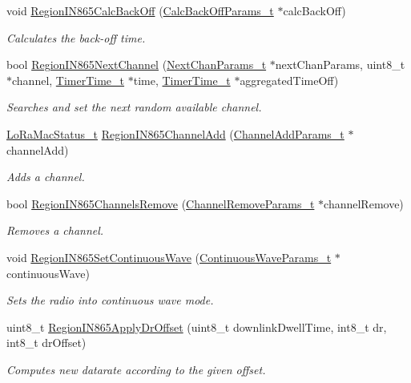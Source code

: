 \begin{DoxyCompactItemize}
void \hyperlink{group__REGIONIN865_ga3227ad7396d15635880bcfe112f57295}{Region\+I\+N865\+Calc\+Back\+Off} (\hyperlink{group__REGION_ga7c5c9a8da174e6679eded8257dc92fd9}{Calc\+Back\+Off\+Params\+\_\+t} $\ast$calc\+Back\+Off)
\begin{DoxyCompactList}\small\item\em Calculates the back-\/off time. \end{DoxyCompactList}\item 
bool \hyperlink{group__REGIONIN865_ga70136739289eea7ad9707011adbad481}{Region\+I\+N865\+Next\+Channel} (\hyperlink{group__REGION_ga115f5e83afae352c0a3dcdc193374040}{Next\+Chan\+Params\+\_\+t} $\ast$next\+Chan\+Params, uint8\+\_\+t $\ast$channel, \hyperlink{utilities_8h_a4215ca43d3e953099ea758ce428599d0}{Timer\+Time\+\_\+t} $\ast$time, \hyperlink{utilities_8h_a4215ca43d3e953099ea758ce428599d0}{Timer\+Time\+\_\+t} $\ast$aggregated\+Time\+Off)
\begin{DoxyCompactList}\small\item\em Searches and set the next random available channel. \end{DoxyCompactList}\item 
\hyperlink{group__LORAMAC_ga30bd25657e10480f8605ee951b0ecfbd}{Lo\+Ra\+Mac\+Status\+\_\+t} \hyperlink{group__REGIONIN865_ga409780ea153146450bde780493f00b1b}{Region\+I\+N865\+Channel\+Add} (\hyperlink{group__REGION_gab1c5f3aa06614283202906cef4417860}{Channel\+Add\+Params\+\_\+t} $\ast$channel\+Add)
\begin{DoxyCompactList}\small\item\em Adds a channel. \end{DoxyCompactList}\item 
bool \hyperlink{group__REGIONIN865_ga06a432cedafb503d6e75757bc7d7e1b0}{Region\+I\+N865\+Channels\+Remove} (\hyperlink{group__REGION_gaa37468560d2fc81a977b57a48e5d72c0}{Channel\+Remove\+Params\+\_\+t} $\ast$channel\+Remove)
\begin{DoxyCompactList}\small\item\em Removes a channel. \end{DoxyCompactList}\item 
void \hyperlink{group__REGIONIN865_gaf8fbc63e4fc4b21a4c69755c1750f194}{Region\+I\+N865\+Set\+Continuous\+Wave} (\hyperlink{group__REGION_gaf39bb5ba06921139c6d17f88a8d518cd}{Continuous\+Wave\+Params\+\_\+t} $\ast$continuous\+Wave)
\begin{DoxyCompactList}\small\item\em Sets the radio into continuous wave mode. \end{DoxyCompactList}\item 
uint8\+\_\+t \hyperlink{group__REGIONIN865_ga19226aa295c5ee39d802b597884ece86}{Region\+I\+N865\+Apply\+Dr\+Offset} (uint8\+\_\+t downlink\+Dwell\+Time, int8\+\_\+t dr, int8\+\_\+t dr\+Offset)
\begin{DoxyCompactList}\small\item\em Computes new datarate according to the given offset. \end{DoxyCompactList}\end{DoxyCompactItemize}


